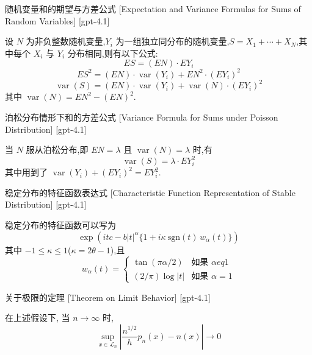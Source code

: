 \documentclass[UTF8]{ctexart}
\begin{document}
    
    
    \begin{thm}
        {随机变量和的期望与方差公式}
        [Expectation and Variance Formulas for Sums of Random Variables]
        [gpt-4.1]
        
设 $N$ 为非负整数随机变量,$Y_i$ 为一组独立同分布的随机变量,$S = X_1 + \cdots + X_N$,其中每个 $X_i$ 与 $Y_i$ 分布相同,则有以下公式:
\[
E S = (E N) \cdot E Y_{i}
\]
\[
E S^2 = (E N) \cdot \operatorname{var}(Y_{i}) + E N^2 \cdot (E Y_{i})^2
\]
\[
\operatorname{var}(S) = (E N) \cdot \operatorname{var}(Y_{i}) + \operatorname{var}(N) \cdot (E Y_{i})^2
\]
其中 $\operatorname{var}(N) = E N^2 - (E N)^2$.

    \end{thm}
    
    
    
    \begin{crl}
        {泊松分布情形下和的方差公式}
        [Variance Formula for Sums under Poisson Distribution]
        [gpt-4.1]
        
当 $N$ 服从泊松分布,即 $E N = \lambda$ 且 $\operatorname{var}(N) = \lambda$ 时,有
\[
\operatorname{var}(S) = \lambda \cdot E Y_{i}^2
\]
其中用到了 $\operatorname{var}(Y_{i}) + (E Y_{i})^2 = E Y_{i}^2$.

    \end{crl}
    
    
    
    \begin{dfn}
        {稳定分布的特征函数表达式}
        [Characteristic Function Representation of Stable Distribution]
        [gpt-4.1]
        
稳定分布的特征函数可以写为
\[
\exp \left( i t c - b |t|^{\alpha} \{ 1 + i \kappa \ \mathrm{sgn}(t) \, w_{\alpha}(t) \} \right)
\]
其中 $-1 \leq \kappa \leq 1$($\kappa = 2 \theta - 1$),且
\[
w_{\alpha}(t) = \begin{cases}
\tan(\pi \alpha / 2) & \text{如果 } \alpha 
eq 1 \\
(2 / \pi) \log |t| & \text{如果 } \alpha = 1
\end{cases}
\]

    \end{dfn}
    
    
    
    \begin{thm}
        {关于极限的定理}
        [Theorem on Limit Behavior]
        [gpt-4.1]
        
在上述假设下, 当 $n \to \infty$ 时,
\[
\sup_{ x \in {\mathcal{L}}_n } \left| \frac{ n^{1/2} }{ h } p_n(x) - n(x) \right| \to 0
\]

    \end{thm}
    
\end{document}
